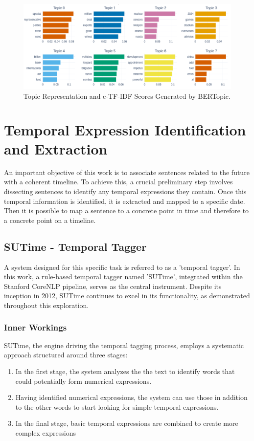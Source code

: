 \documentclass[a4paper,12pt]{report} %
\begin{document}
\begin{figure}
  \centering
  \includegraphics[width=15cm]{img/topic_representation.png}
  \caption{Topic Representation and c-TF-IDF Scores Generated by BERTopic.}
  \label{fig:topic_representation}
\end{figure}


\chapter{Temporal Expression Identification and Extraction}
An important objective of this work is to associate sentences related to the future with a coherent timeline. To achieve this, a crucial preliminary step involves dissecting sentences to identify any temporal expressions they contain. Once this temporal information is identified, it is extracted and mapped to a specific date. Then it is possible to map a sentence to a concrete point in time and therefore to a concrete point on a timeline.

\section{SUTime - Temporal Tagger}
A system designed for this specific task is referred to as a 'temporal tagger'. In this work, a rule-based temporal tagger named 'SUTime', integrated within the Stanford CoreNLP pipeline, serves as the central instrument. Despite its inception in 2012, SUTime continues to excel in its functionality, as demonstrated throughout this exploration.

\subsection{Inner Workings}
SUTime, the engine driving the temporal tagging process, employs a systematic approach structured around three stages:

\begin{enumerate}
  \item In the first stage, the system analyzes the the text to identify words that could potentially form numerical expressions.

  \item Having identified numerical expressions, the system can use those in addition to the other words to start looking for simple temporal expressions.

  \item In the final stage, basic temporal expressions are combined to create more complex expressions
\end{enumerate}
\end{document}
